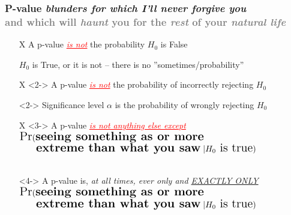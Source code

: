 \documentclass[xcolor={dvipsnames}]{beamer}
\begin{document}
\frame
{
\frametitle{P-value \emph{blunders for which I'll never forgive you} \\\textcolor{gray}{and which will \emph{haunt} you for the \emph{rest} of your \emph{natural life}}}

\begin{itemize}
\item[X] A p-value \textcolor{red}{\underline{\emph{is not}}} the probability $H_0$ is False
\item[\checkmark] $H_0$ is True, or it is not -- there is no ''sometimes/probability''
\item[] 
\item[X]<2-> A p-value \textcolor{red}{\underline{\emph{is not}}} the probability of incorrectly rejecting $H_0$
\item[\checkmark]<2-> Significance level $\alpha$ is the probability of wrongly rejecting $H_0$
\item[]
\item[X]<3-> A p-value \textcolor{red}{\underline{\emph{is not anything else except}}} 
$\Large\text{Pr}(\textbf{seeing something as or more}$\\ 
$\Large\quad\;\;\textbf{extreme than what you saw} \;  | H_0 \text{ is true})$\\${}$\\

\item[\checkmark]<4-> A p-value is, \emph{at all times, ever only and \underline{EXACTLY ONLY}} 
$\Large\text{Pr}(\textbf{seeing something as or more}$\\ 
$\Large\quad\;\;\textbf{extreme than what you saw} \; | H_0 \text{ is true})$
\end{itemize}
}
\end{document}
